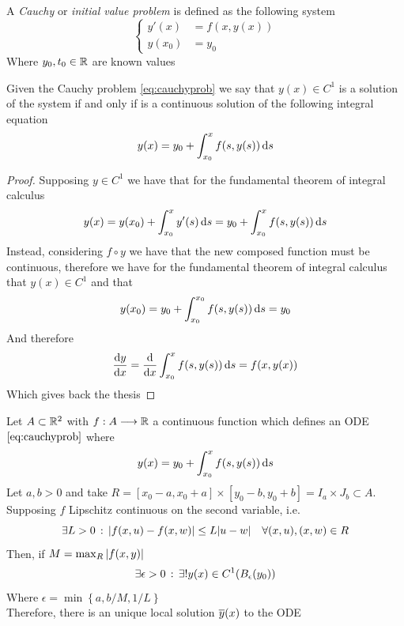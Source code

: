 \documentclass[../complete.tex]{subfiles}
\begin{document}
\begin{dfn}
	A \textit{Cauchy} or \textit{initial value problem} is defined as the following system
	\begin{equation}
		\left\{ \begin{aligned}
				y'(x)&=f(x,y(x))\\
				y(x_0)&=y_0
		\end{aligned}\right.
		\label{eq:cauchyprob}
	\end{equation}
	Where $y_0,t_0\in\mathbb{R}$ are known values
\end{dfn}
\begin{thm}
	Given the Cauchy problem \eqref{eq:cauchyprob} we say that $y(x)\in C^1$ is a solution of the system if and only if is a continuous solution of the following integral equation
	\begin{equation}
		y(x)=y_0+\int_{x_0}^{x}f(s,y(s))\operatorname{d\!} s
		\label{eq:cauchyprobsol}
	\end{equation}
\end{thm}
\begin{proof}
	Supposing $y\in C^1$ we have that for the fundamental theorem of integral calculus
	\begin{equation*}
		y(x)=y(x_0)+\int_{x_0}^{x}y'(s)\operatorname{d\!} s=y_0+\int_{x_0}^{x}f(s,y(s))\operatorname{d\!} s
	\end{equation*}
	Instead, considering $f\circ y$ we have that the new composed function must be continuous, therefore we have for the fundamental theorem of integral calculus that $y(x)\in C^1$ and that
	\begin{equation*}
		y(x_0)=y_0+\int_{x_0}^{x_0}f(s,y(s))\operatorname{d\!} s=y_0
	\end{equation*}
	And therefore
	\begin{equation*}
		\derivative{y}{x}=\derivative{x}\int_{x_0}^{x}f(s,y(s))\diff s=f(x,y(x))
	\end{equation*}
	Which gives back the thesis
\end{proof}
\begin{thm}
	Let $A\subset\mathbb{R}^2$ with $f:A\overset{}{\longrightarrow}\mathbb{R}$ a continuous function which defines an ODE $\eqref{eq:cauchyprob}$ where
	\begin{equation*}
		y(x)=y_0+\int_{x_0}^{x}f(s,y(s))\operatorname{d\!} s
	\end{equation*}
	Let $a,b>0$ and take $R=[x_0-a,x_0+a]\times[y_0-b,y_0+b]=I_a\times J_b\subset A$. Supposing $f$ Lipschitz continuous on the second variable, i.e.
	\begin{equation*}
		\exists L>0\, :\, \abs{f(x,u)-f(x,w)}\le L\abs{u-w}\quad \forall (x,u),(x,w)\in R
	\end{equation*}
	Then, if $M=\max_R\abs{f(x,y)}$
	\begin{equation*}
		\exists\epsilon>0\, :\, \exists!y(x)\in C^1(B_\epsilon(y_0))
	\end{equation*}
	Where $\epsilon=\min\left\{ a,b/M,1/L \right\}$\\
	Therefore, there is an unique local solution $\overline{y}(x)$ to the ODE
\end{thm}
\end{document}
